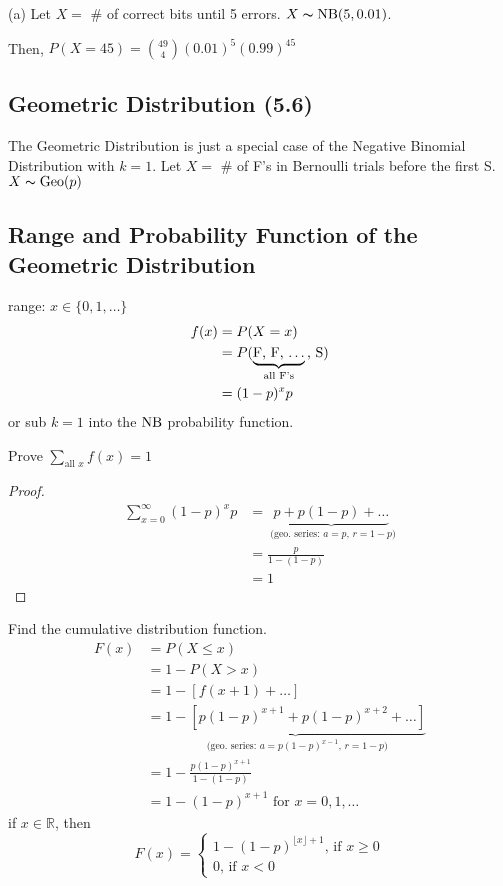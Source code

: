 (a) Let $ X= $ \# of correct bits until 5 errors.
$ X\thicksim\operatorname{NB}(5,0.01) $.

Then, $ P(X=45)=\binom{49}{4}(0.01)^5(0.99)^{45} $

\subsection{Geometric Distribution (5.6)}
The Geometric Distribution is just a special case of the
Negative Binomial Distribution with $ k=1 $.
Let $ X= $ \# of F's in Bernoulli trials before the first S.
$ X\thicksim\operatorname{Geo}(p) $

\subsection{Range and Probability Function of the Geometric Distribution}
range: $ x\in\{0,1,\ldots \} $
\begin{align*}
    f(x) & =P(X=x)                                                   \\
         & =P( \underbrace{\text{F, F, $ \ldots $}}_{\text{all F's}}
    \text{, S})                                                      \\
         & =(1-p)^x p
\end{align*}
or sub $ k=1 $ into the $ \operatorname{NB} $ probability function.

Prove $ \sum\limits_{\text{all } x}^{} f(x) =1$
\begin{proof}
    \begin{align*}
        \sum\limits_{x=0}^{\infty} (1-p)^x p
         & =\underbrace{p+p(1-p)+\dots}_
        \text{ (geo. series: $a=p$, $r=1-p$)} \\
         & =\frac{p}{1-(1-p)}                 \\
         & =1
    \end{align*}
\end{proof}

Find the cumulative distribution function.
\begin{align*}
    F(x) & =P(X\le x)                                         \\
         & =1-P(X>x)                                          \\
         & =1-[f(x+1)+\dots]                                  \\
         & =\underbrace{1-[p(1-p)^{x+1}+p(1-p)^{x+2}+\dots]}_
    \text{ (geo. series: $a=p(1-p)^{x-1}$, $r=1-p$)}          \\
         & =1-\frac{p(1-p)^{x+1}}{1-(1-p)}                    \\
         & =1-(1-p)^{x+1} \text{ for } x=0,1,\ldots
\end{align*}
if $ x\in\mathbb{R} $, then
\[ F(x)=
    \begin{cases}
        1-(1-p)^{\lfloor x \rfloor +1} \text{, if } x\ge 0 \\
        0 \text{, if } x < 0
    \end{cases} \]


